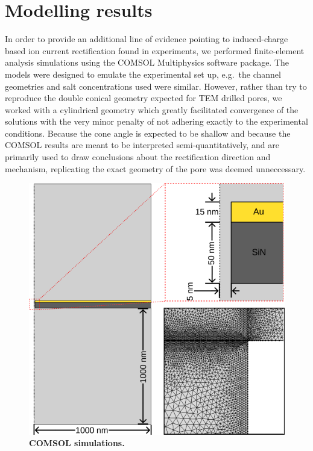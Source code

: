 	\section{Modelling results}
		
		In order to provide an additional line of evidence pointing to induced-charge based ion current rectification found in experiments, we performed finite-element analysis simulations using the COMSOL Multiphysics software package. The models were designed to emulate the experimental set up, e.g.~the channel geometries and salt concentrations used were similar. However, rather than try to reproduce the double conical geometry expected for TEM drilled pores, we worked with a cylindrical geometry which greatly facilitated convergence of the solutions with the very minor penalty of not adhering exactly to the experimental conditions. Because the cone angle is expected to be shallow and because the COMSOL results are meant to be interpreted semi-quantitatively, and are primarily used to draw conclusions about the rectification direction and mechanism, replicating the exact geometry of the pore was deemed unneccessary.
		
		\begin{figure}
			\includegraphics[width=\textwidth]{comsol_model}
			\caption{\textbf{COMSOL simulations.}}
			\label{fig:comsolmodel}
		\end{figure}
		
